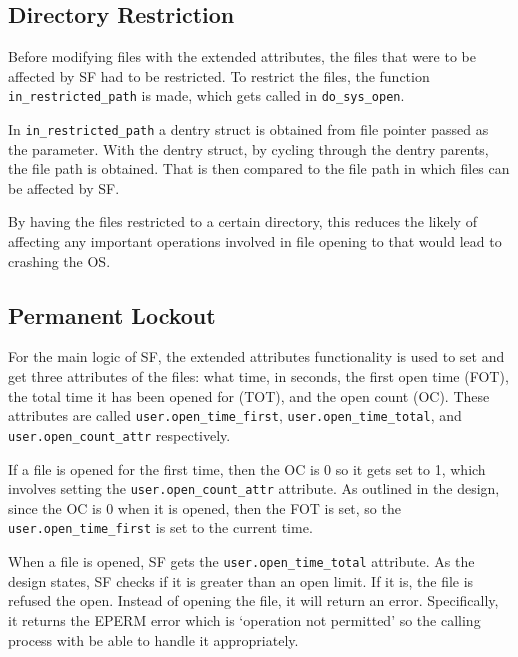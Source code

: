 \subsection{Directory Restriction}
Before modifying files with the extended attributes, the files that were to be affected by SF had to be restricted. To restrict the files, the function \texttt{in\_restricted\_path} is made, which gets called in \texttt{do\_sys\_open}. 

In \texttt{in\_restricted\_path} a dentry struct is obtained from file pointer passed as the parameter. With the dentry struct, by cycling through the dentry parents, the file path is obtained. That is then compared to the file path in which files can be affected by SF.

By having the files restricted to a certain directory, this reduces the likely of affecting any important operations involved in file opening to that would lead to crashing the OS. 

\subsection{Permanent Lockout}
For the main logic of SF, the extended attributes functionality is used to set and get three attributes of the files: what time, in seconds, the first open time (FOT), the total time it has been opened for (TOT), and the open count (OC). These attributes are called \texttt{user.open\_time\_first}, \texttt{user.open\_time\_total}, and \texttt{user.open\_count\_attr} respectively.

If a file is opened for the first time, then the OC is 0 so it gets set to 1, which involves setting the \texttt{user.open\_count\_attr} attribute. As outlined in the design, since the OC is 0 when it is opened, then the FOT is set, so the \texttt{user.open\_time\_first} is set to the current time.

When a file is opened, SF gets the \texttt{user.open\_time\_total} attribute. As the design states, SF checks if it is greater than an open limit. If it is, the file is refused the open. Instead of opening the file, it will return an error. Specifically, it returns the EPERM error which is `operation not permitted' so the calling process with be able to handle it appropriately. 

